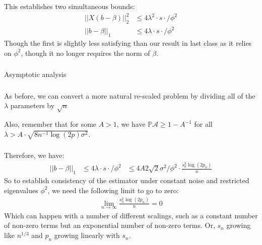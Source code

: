 \begin{frame}[fragile] \frametitle{}

This establishes two simultaneous bounds:
\begin{align*}
|| X ( b - \beta) ||_2^2 &\leq 4 \lambda^2 \cdot s \cdot / \phi^2 \\
|| b - \beta ||_1 &\leq 4 \lambda \cdot s \cdot / \phi^2
\end{align*}
Though the first is slightly less satisfying than our result
in last class as it relies on $\phi^2$, though it no longer requires
the norm of $\beta$.

\end{frame}

\begin{frame}[fragile] \frametitle{}

\begin{flushright}
{\color{yaleblue}\sc\fontsize{1cm}{0cm}\selectfont Asymptotic analysis}
\end{flushright}

\end{frame}

\begin{frame}[fragile] \frametitle{}

As before, we can convert a more natural re-scaled problem by dividing all of the
$\lambda$ parameters by $\sqrt{n}$

Also, remember that for some $A > 1$, we have $\mathbb{P} \mathcal{A} \geq 1 - A^{-1}$
for all $\lambda > A \cdot \sqrt{8 n^{-1} \log(2p) \sigma^2}$.

\end{frame}

\begin{frame}[fragile] \frametitle{}

Therefore, we have:
\begin{align*}
|| b - \beta ||_1 &\leq 4 \lambda \cdot s \cdot / \phi^2
&\leq 4 A 2 \sqrt{2} \sigma^2 / \phi^2 \cdot \frac{s_n^2 \log(2p_n)}{n}
\end{align*}
So to establish consistency of the estimator under constant noise and
restricted eigenvalues $\phi^2$, we need the following limit to
go to zero:
\begin{align*}
\lim_{n \rightarrow \infty} \frac{s_n^2 \log(2p_n)}{n} = 0
\end{align*}
Which can happen with a number of different scalings, such as a constant
number of non-zero terms but an exponential number of non-zero terms. Or,
$s_n$ growing like $n^{1/3}$ and $p_n$ growing linearly with $s_n$.

\end{frame}


